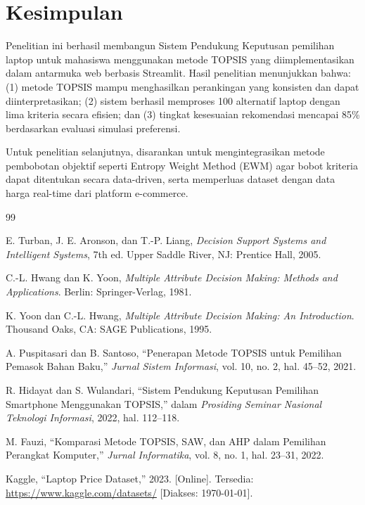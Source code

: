 \documentclass[10pt, a4paper, twocolumn]{article}
\begin{document}
\section{Kesimpulan}

Penelitian ini berhasil membangun Sistem Pendukung Keputusan pemilihan laptop untuk mahasiswa menggunakan metode TOPSIS yang diimplementasikan dalam antarmuka web berbasis Streamlit. Hasil penelitian menunjukkan bahwa: (1) metode TOPSIS mampu menghasilkan perankingan yang konsisten dan dapat diinterpretasikan; (2) sistem berhasil memproses 100 alternatif laptop dengan lima kriteria secara efisien; dan (3) tingkat kesesuaian rekomendasi mencapai 85\% berdasarkan evaluasi simulasi preferensi.

Untuk penelitian selanjutnya, disarankan untuk mengintegrasikan metode pembobotan objektif seperti Entropy Weight Method (EWM) agar bobot kriteria dapat ditentukan secara data-driven, serta memperluas dataset dengan data harga real-time dari platform e-commerce.


\begin{thebibliography}{99}

E. Turban, J. E. Aronson, dan T.-P. Liang, \textit{Decision Support Systems and Intelligent Systems}, 7th ed. Upper Saddle River, NJ: Prentice Hall, 2005.

C.-L. Hwang dan K. Yoon, \textit{Multiple Attribute Decision Making: Methods and Applications}. Berlin: Springer-Verlag, 1981.

K. Yoon dan C.-L. Hwang, \textit{Multiple Attribute Decision Making: An Introduction}. Thousand Oaks, CA: SAGE Publications, 1995.

A. Puspitasari dan B. Santoso, ``Penerapan Metode TOPSIS untuk Pemilihan Pemasok Bahan Baku,'' \textit{Jurnal Sistem Informasi}, vol. 10, no. 2, hal. 45--52, 2021.

R. Hidayat dan S. Wulandari, ``Sistem Pendukung Keputusan Pemilihan Smartphone Menggunakan TOPSIS,'' dalam \textit{Prosiding Seminar Nasional Teknologi Informasi}, 2022, hal. 112--118.

M. Fauzi, ``Komparasi Metode TOPSIS, SAW, dan AHP dalam Pemilihan Perangkat Komputer,'' \textit{Jurnal Informatika}, vol. 8, no. 1, hal. 23--31, 2022.

Kaggle, ``Laptop Price Dataset,'' 2023. [Online]. Tersedia: \url{https://www.kaggle.com/datasets/} [Diakses: \today].

\end{thebibliography}
\end{document}

